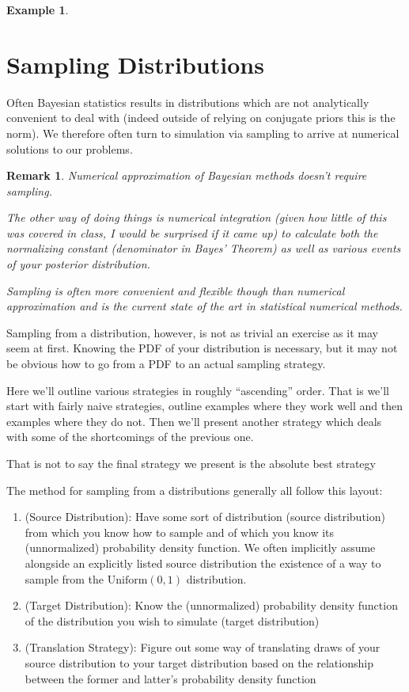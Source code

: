 \documentclass{article}
\newtheorem{example}{Example}
\newtheorem{remark}{Remark}
\begin{document}
\begin{example}
\end{example}

\section{Sampling Distributions}

Often Bayesian statistics results in distributions which are not analytically convenient to deal with (indeed outside of relying on conjugate priors this is the norm).
We therefore often turn to simulation via sampling to arrive at numerical solutions to our problems.

\begin{remark}
	Numerical approximation of Bayesian methods doesn't require sampling.

	The other way of doing things is numerical integration (given how little of
	this was covered in class, I would be surprised if it came up) to calculate
	both the normalizing constant (denominator in Bayes' Theorem) as well as
	various events of your posterior distribution.

	Sampling is often more convenient and flexible though than numerical approximation and is the current state of the art in statistical numerical methods.
\end{remark}

Sampling from a distribution, however, is not as trivial an exercise as it may seem at first.
Knowing the PDF of your distribution is necessary, but it may not be obvious how to go from a PDF to an actual sampling strategy.

Here we'll outline various strategies in roughly ``ascending'' order.
That is we'll start with fairly naive strategies, outline examples where they work well and then examples where they do not.
Then we'll present another strategy which deals with some of the shortcomings of the previous one.

That is not to say the final strategy we present is the absolute best strategy 

The method for sampling from a distributions generally all follow this layout:
\begin{enumerate}
	\item
		(Source Distribution):
		Have some sort of distribution (source distribution) from which you know how to sample and of which you know its (unnormalized) probability density function.
		We often implicitly assume alongside an explicitly listed source distribution the existence of a way to sample from the $\text{Uniform}(0, 1)$ distribution.
	\item
		(Target Distribution):
		Know the (unnormalized) probability density function of the distribution you wish to simulate (target distribution)
	\item
		(Translation Strategy):
		Figure out some way of translating draws of your source distribution to your target distribution based on the relationship between the former and latter's probability density function
\end{enumerate}
\end{document}
